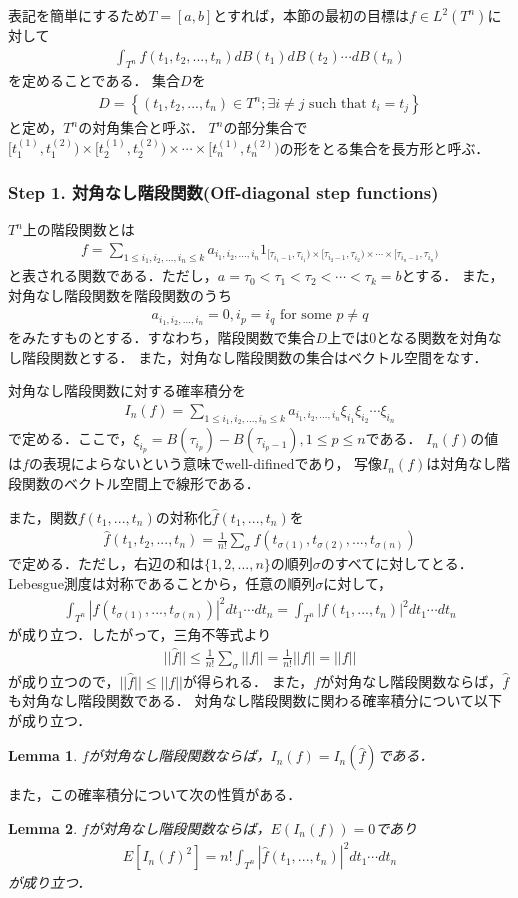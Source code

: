 \documentclass[a4paper,10pt]{jsarticle}
\theoremstyle{plain}
\newtheorem{lemma}{Lemma}
\newcommand{\eq}[1]{\begin{align}#1\end{align}}
\begin{document}
表記を簡単にするため$T=[a,b]$とすれば，本節の最初の目標は$f\in L^2(T^n)$に対して
\eq{\int_{T^n}f(t_1,t_2,...,t_n)dB(t_1)dB(t_2)\cdots dB(t_n)}
を定めることである．
集合$D$を
\eq{D=\left\{(t_1,t_2,...,t_n)\in T^n;\exists i\neq j\text{ such that }t_i=t_j\right\}}
と定め，$T^n$の対角集合と呼ぶ．
$T^n$の部分集合で$[t_1^{(1)},t_1^{(2)})\times[t_2^{(1)},t_2^{(2)})\times\cdots\times[t_n^{(1)},t_n^{(2)})$の形をとる集合を長方形と呼ぶ．

\subsubsection*{Step 1. 対角なし階段関数(Off-diagonal step functions)}
$T^n$上の階段関数とは
\eq{f=\sum_{1\le i_1,i_2,...,i_n\le k}a_{i_1,i_2,...,i_n}1_{[\tau_{i_1-1},\tau_{i_1})\times[\tau_{i_2-1},\tau_{i_2})\times\cdots\times[\tau_{i_n-1},\tau_{i_n})}}
と表される関数である．ただし，$a=\tau_0<\tau_1<\tau_2<\cdots<\tau_k=b$とする．
また，対角なし階段関数を階段関数のうち
\eq{a_{i_1,i_2,...,i_n}=0,i_p=i_q\text{ for some }p\neq q}
をみたすものとする．すなわち，階段関数で集合$D$上では$0$となる関数を対角なし階段関数とする．
また，対角なし階段関数の集合はベクトル空間をなす．

対角なし階段関数に対する確率積分を
\eq{I_n(f)=\sum_{1\le i_1,i_2,...,i_n\le k}a_{i_1,i_2,...,i_n}\xi_{i_1}\xi_{i_2}\cdots\xi_{i_n}}
で定める．ここで，$\xi_{i_p}=B(\tau_{i_p})-B(\tau_{i_p-1}),1\le p\le n$である．
$I_n(f)$の値は$f$の表現によらないという意味でwell-difinedであり，
写像$I_n(f)$は対角なし階段関数のベクトル空間上で線形である．

また，関数$f(t_1,...,t_n)$の対称化$\hat{f}(t_1,...,t_n)$を
\eq{\hat{f}(t_1,t_2,...,t_n)=\frac{1}{n!}\sum_\sigma f(t_{\sigma(1)},t_{\sigma(2)},...,t_{\sigma(n)})}
で定める．ただし，右辺の和は$\{1,2,...,n\}$の順列$\sigma$のすべてに対してとる．
Lebesgue測度は対称であることから，任意の順列$\sigma$に対して，
\eq{\int_{T^n}|f(t_{\sigma(1)},...,t_{\sigma(n)})|^2dt_1\cdots dt_n=\int_{T^n}|f(t_1,...,t_n)|^2dt_1\cdots dt_n}
が成り立つ．したがって，三角不等式より
\eq{||\hat{f}||\le\frac{1}{n!}\sum_\sigma||f||=\frac{1}{n!}||f||=||f||}
が成り立つので，$||\hat{f}||\le||f||$が得られる．
また，$f$が対角なし階段関数ならば，$\hat{f}$も対角なし階段関数である．
対角なし階段関数に関わる確率積分について以下が成り立つ．

\begin{lemma}\label{lem9.6.2}
$f$が対角なし階段関数ならば，$I_n(f)=I_n(\hat{f})$である．
\end{lemma}
また，この確率積分について次の性質がある．
\begin{lemma}\label{lem9.6.3}
$f$が対角なし階段関数ならば，$E\left(I_n(f)\right)=0$であり
\eq{E\left[I_n(f)^2\right]=n!\int_{T^n}|\hat{f}(t_1,...,t_n)|^2dt_1\cdots dt_n}
が成り立つ．
\end{lemma}
\end{document}
